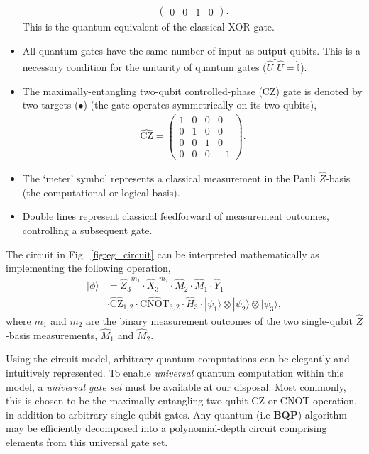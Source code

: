 \documentclass[aps, rmp, twocolumn, amsmath, amssymb, nofootinbib, superscriptaddress, longbibliography, floatfix, table-of-contents, eqsecnum]{revtex4-1}
\newcommand{\ket}[1]{|#1\rangle}
\begin{document}
\begin{itemize}
\begin{align}
\begin{pmatrix}
		0 & 0 & 1 & 0
		\end{pmatrix}.
	\end{align}
	This is the quantum equivalent of the classical XOR gate.
	\item All quantum gates have the same number of input as output qubits. This is a necessary condition for the unitarity of quantum gates (\mbox{$\hat{U}^\dag \hat{U} = \hat{\mathbb{I}}$}).
	\item The maximally-entangling two-qubit controlled-phase (CZ) gate is denoted by two targets ($\bullet$) (the gate operates symmetrically on its two qubits),
	\begin{align}
		\hat{\text{CZ}}=\begin{pmatrix}
		1 & 0 & 0 & 0 \\
		0 & 1 & 0 & 0 \\
		0 & 0 & 1 & 0 \\
		0 & 0 & 0 & -1
		\end{pmatrix}.
	\end{align}
	\item The `meter' symbol represents a classical measurement in the Pauli $\hat{Z}$-basis (the computational or logical basis).
	\item Double lines represent classical feedforward of measurement outcomes, controlling a subsequent gate.
\end{itemize}

The circuit in Fig.~\ref{fig:eg_circuit} can be interpreted mathematically as implementing the following operation,
\begin{align}
	\ket\phi &= {\hat{Z}_3}^{m_1} \cdot {\hat{X}_3}^{m_2} \cdot \hat{M}_2 \cdot \hat{M}_1 \cdot \hat{Y}_1 \nonumber \\
	&\cdot \hat{\text{CZ}}_{1,2} \cdot \hat{\text{CNOT}}_{3,2} \cdot \hat{H}_3 \cdot \ket{\psi_1}\otimes\ket{\psi_2}\otimes\ket{\psi_3},
\end{align}
where $m_1$ and $m_2$ are the binary measurement outcomes of the two single-qubit $\hat{Z}$-basis measurements, $\hat{M}_1$ and $\hat{M}_2$.

Using the circuit model, arbitrary quantum computations can be elegantly and intuitively represented. To enable \textit{universal} quantum computation within this model, a \textit{universal gate set} must be available at our disposal. Most commonly, this is chosen to be the maximally-entangling two-qubit CZ or CNOT operation, in addition to arbitrary single-qubit gates. Any quantum (i.e \textbf{BQP}) algorithm may be efficiently decomposed into a polynomial-depth circuit comprising elements from this universal gate set.
\end{document}
